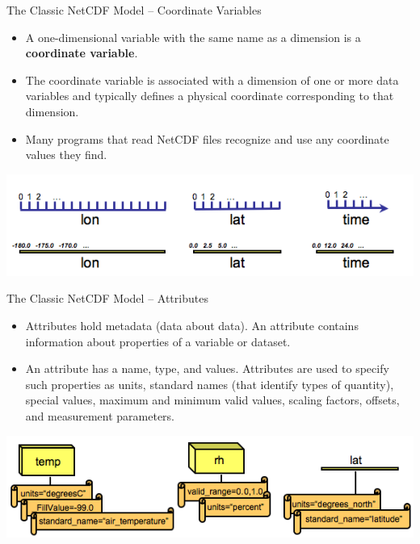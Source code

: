 \documentclass[compress,11pt,xcolor=svgnames,aspectratio=169]{beamer}
\begin{document}
\begin{frame}[fragile]{The Classic NetCDF Model -- Coordinate Variables}

\begin{itemize}
\setlength\itemsep{0.4cm}

  \item A one-dimensional variable with the same name as a dimension is a \textbf{coordinate variable}.

  \item The coordinate variable is associated with a dimension of one or more data variables and typically defines a physical coordinate corresponding to that dimension.

  \item Many programs that read NetCDF files recognize and use any coordinate values they find.

\end{itemize}

\begin{center}
\includegraphics[scale=0.5]{fig/nccoords}
\end{center}

\nocite{netcdf}

\end{frame}

\begin{frame}[fragile]{The Classic NetCDF Model -- Attributes}

\begin{itemize}
\setlength\itemsep{0.4cm}

  \item Attributes hold metadata (data about data). An attribute contains information about properties of a variable or dataset.

  \item An attribute has a name, type, and values. Attributes are used to specify such properties as units, standard names (that identify types of quantity), special values, maximum and minimum valid values, scaling factors, offsets, and measurement parameters.

\end{itemize}

\begin{center}
\includegraphics[scale=0.5]{fig/ncatts}
\end{center}

\nocite{netcdf}

\end{frame}
\end{document}
